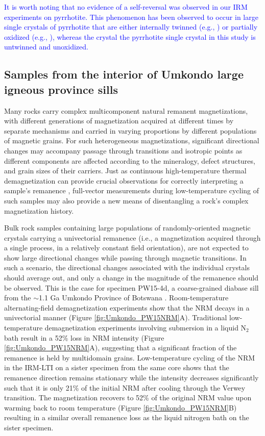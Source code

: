 \documentclass[draft,gc]{AGUTeX}
\begin{document}
\begin{article}
\textcolor{blue}{It is worth noting that no evidence of a self-reversal was observed in our IRM experiments on pyrrhotite. This phenomenon has been observed to occur in large single crystals of pyrrhotite that are either internally twinned (e.g., \citep{Zapletal1992a}) or partially oxidized (e.g., \citep{Bina1994a}), whereas the crystal the pyrrhotite single crystal in this study is untwinned and unoxidized.}

\subsection{Samples from the interior of Umkondo large igneous province sills}

Many rocks carry complex multicomponent natural remanent magnetizations, with different generations of magnetization acquired at different times by separate mechanisms and carried in varying proportions by different populations of magnetic grains. For such heterogeneous magnetizations, significant directional changes may accompany passage through transitions and isotropic points as different components are affected according to the mineralogy, defect structures, and grain sizes of their carriers. Just as continuous high-temperature thermal demagnetization can provide crucial observations for correctly interpreting a sample's remanence \citep{Wack2007a, Coe2014a}, full-vector measurements during low-temperature cycling of such samples may also provide a new means of disentangling a rock's complex magnetization history. 

Bulk rock samples containing large populations of randomly-oriented magnetic crystals carrying a univectorial remanence (i.e., a magnetization acquired through a single process, in a relatively constant field orientation), are not expected to show large directional changes while passing through magnetic transitions. In such a scenario, the directional changes associated with the individual crystals should average out, and only a change in the magnitude of the remanence should be observed. This is the case for specimen PW15-4d, a coarse-grained diabase sill from the $\sim$1.1 Ga Umkondo Province of Botswana \citep{Hanson2004a}. Room-temperature alternating-field demagnetization experiments show that the NRM decays in a univectorial manner (Figure \ref{fig:Umkondo_PW15NRM}A). Traditional low-temperature demagnetization experiments involving submersion in a liquid N$_{2}$ bath result in a 52\% loss in NRM intensity (Figure \ref{fig:Umkondo_PW15NRM}A), suggesting that a significant fraction of the remanence is held by multidomain grains. Low-temperature cycling of the NRM in the IRM-LTI on a sister specimen from the same core shows that the remanence direction remains stationary while the intensity decreases significantly such that it is only 21\% of the initial NRM after cooling through the Verwey transition. The magnetization recovers to 52\% of the original NRM value upon warming back to room temperature (Figure \ref{fig:Umkondo_PW15NRM}B) resulting in a similar overall remanence loss as the liquid nitrogen bath on the sister specimen.


\end{article}
\end{document}
